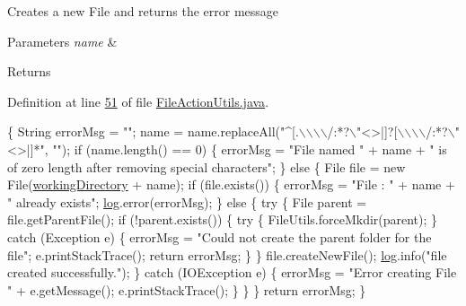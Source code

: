 Creates a new File and returns the error message


\begin{DoxyParams}{Parameters}
{\em name} & \\
\hline
\end{DoxyParams}
\begin{DoxyReturn}{Returns}

\end{DoxyReturn}


Definition at line \hyperlink{L51}{51} of file \hyperlink{}{File\-Action\-Utils.\-java}.


\begin{DoxyCode}
                                                 \{
        String errorMsg = \textcolor{stringliteral}{""};
        name = name.replaceAll(\textcolor{stringliteral}{"^[.\(\backslash\)\(\backslash\)\(\backslash\)\(\backslash\)/:*?\(\backslash\)"<>|]?[\(\backslash\)\(\backslash\)\(\backslash\)\(\backslash\)/:*?\(\backslash\)"<>|]*"}, \textcolor{stringliteral}{""});
        \textcolor{keywordflow}{if} (name.length() == 0) \{
            errorMsg = \textcolor{stringliteral}{"File named "} + name
                    + \textcolor{stringliteral}{" is of zero length after removing special characters"};
        \} \textcolor{keywordflow}{else} \{
            File file = \textcolor{keyword}{new} File(\hyperlink{classcom_1_1poly_1_1nlp_1_1filekommander_1_1file_1_1actions_1_1_file_action_utils_ad54a8fdc9145d2f423c54cb1597f874a}{workingDirectory} + name);
            \textcolor{keywordflow}{if} (file.exists()) \{
                errorMsg = \textcolor{stringliteral}{"File : "} + name + \textcolor{stringliteral}{" already exists"};
                \hyperlink{classcom_1_1poly_1_1nlp_1_1filekommander_1_1file_1_1actions_1_1_file_action_utils_a7af6d26171248a2e7253d9bce1b287cc}{log}.error(errorMsg);
            \} \textcolor{keywordflow}{else} \{
                \textcolor{keywordflow}{try} \{
                    File parent = file.getParentFile();
                    \textcolor{keywordflow}{if} (!parent.exists()) \{
                        \textcolor{keywordflow}{try} \{
                            FileUtils.forceMkdir(parent);
                        \} \textcolor{keywordflow}{catch} (Exception e) \{
                            errorMsg = \textcolor{stringliteral}{"Could not create the parent folder for
       the file"};
                            e.printStackTrace();
                            \textcolor{keywordflow}{return} errorMsg;
                        \}
                    \}
                    file.createNewFile();
                    \hyperlink{classcom_1_1poly_1_1nlp_1_1filekommander_1_1file_1_1actions_1_1_file_action_utils_a7af6d26171248a2e7253d9bce1b287cc}{log}.info(\textcolor{stringliteral}{"file created successfully."});
                \} \textcolor{keywordflow}{catch} (IOException e) \{
                    errorMsg = \textcolor{stringliteral}{"Error creating File "} + e.getMessage();
                    e.printStackTrace();
                \}
            \}
        \}
        \textcolor{keywordflow}{return} errorMsg;
    \}
\end{DoxyCode}
